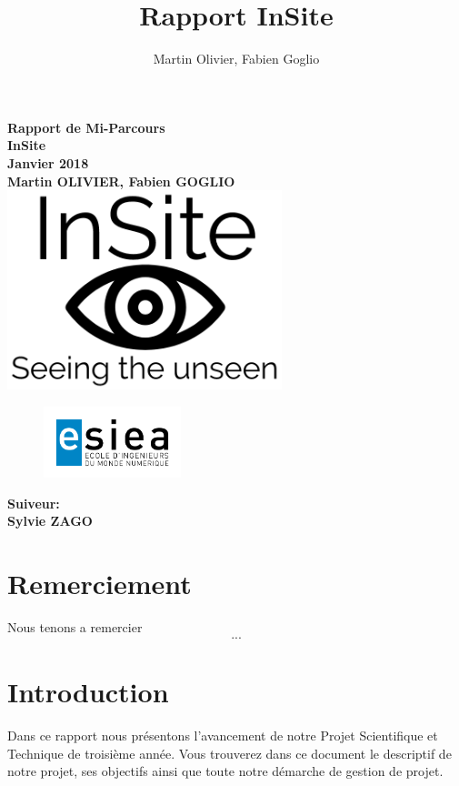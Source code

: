 \documentclass[a4paper, 12pt, titlepage, oneside, french]{article}
\author{Martin Olivier, Fabien Goglio}
\title{Rapport InSite}
\begin{document}
\begin{titlepage}
	\centering
		\vfill
		    {\bfseries\Large
			Rapport de Mi-Parcours\\
			InSite\\
			Janvier 2018\\
			\vskip2cm
			Martin OLIVIER, Fabien GOGLIO\\
		    }    
		\vfill
		\includegraphics[width=8cm]{Logo_Preview.png}
		\begin{figure}[b]
			\includegraphics[width=4cm]{Logo-ESIEA.jpg}

		\end{figure}
		\vfill
		\hfill {\bfseries\Large
		 Suiveur:\\
		 \hfill Sylvie ZAGO}
\end{titlepage}

\newpage
	\tableofcontents
\newpage
\cleardoublepage
{}
\section{Remerciement}
	Nous tenons a remercier \[...\]
	\newpage
\section{Introduction}
	Dans ce rapport nous présentons l'avancement de notre Projet Scientifique et Technique de troisième année.
	Vous trouverez dans ce document le descriptif de notre projet, ses objectifs ainsi que toute notre démarche de gestion de projet.

	\paragraph{}
\end{document}
